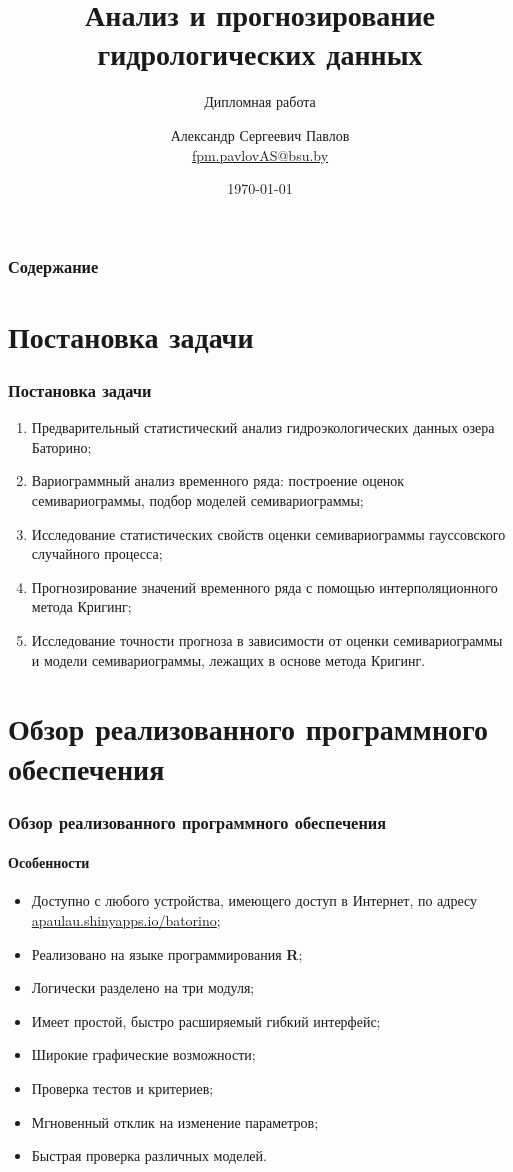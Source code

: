 \documentclass{beamer}
\title[Анализ и прогнозирование гидрологических данных]{Анализ и прогнозирование гидрологических данных}
\subtitle{Дипломная работа}
\author[Павлов А.С.]{Александр Сергеевич Павлов \\ \smallskip \scriptsize \url{fpm.pavlovAS@bsu.by}\\\url{}}
\institute[Белорусский государственный университет]{Белорусский государственный университет \\ Минск}
\date{\today}
\begin{document}

\frame[plain]{\titlepage}    %

\section[Содержание]{}
\begin{frame}
  \frametitle{Содержание}
  \tableofcontents
\end{frame}

\section{Постановка задачи}
\begin{frame}
  \frametitle{Постановка задачи}
  \begin{enumerate}
    \item Предварительный статистический анализ гидроэкологических данных озера Баторино;
    \item Вариограммный анализ временного ряда: построение оценок семивариограммы,  подбор моделей семивариограммы;
    \item Исследование статистических свойств оценки семивариограммы гауссовского случайного процесса;
    \item Прогнозирование значений временного ряда с помощью интерполяционного метода Кригинг;
    \item Исследование точности прогноза в зависимости от оценки семивариограммы и модели семивариограммы, лежащих в основе метода Кригинг.
  \end{enumerate}
\end{frame}

\section{Обзор реализованного программного обеспечения}
\begin{frame}
  \frametitle{Обзор реализованного программного обеспечения}
  \framesubtitle{Особенности}
  \begin{itemize}
    \item Доступно с любого устройства, имеющего доступ в Интернет, по адресу \href{https://apaulau.shinyapps.io/batorino}{apaulau.shinyapps.io/batorino};
    \item Реализовано на языке программирования \textbf{R};
    \item Логически разделено на три модуля;
    \item Имеет простой, быстро расширяемый гибкий интерфейс;
    \item Широкие графические возможности;
    \item Проверка тестов и критериев;
    \item Мгновенный отклик на изменение параметров;
    \item Быстрая проверка различных моделей.
  \end{itemize}
\end{frame}
\end{document}
